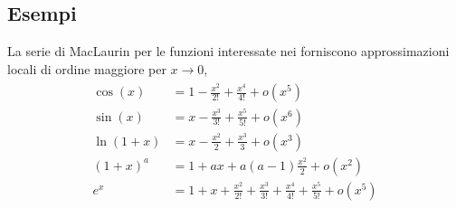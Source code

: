 \documentclass[letterpaper,10pt,italian]{jupyterBook}
\begin{document}
\subsection{Esempi}
\label{\detokenize{ch/infinitesimal_calculus/derivatives:esempi}}
\sphinxAtStartPar
La serie di MacLaurin per le funzioni interessate nei {\hyperref[\detokenize{ch/infinitesimal_calculus/analysis:infinitesimal-calculus-limits-fund}]{}} forniscono approssimazioni locali di ordine maggiore per \(x \rightarrow 0\),
\begin{equation}\label{equation:ch/infinitesimal_calculus/derivatives:eq:infinitesimal-calculus:derivatives:taylor:fund-limits}
\begin{split}\begin{aligned}
 \cos(x) & = 1 - \frac{x^2}{2!} + \frac{x^4}{4!} + o(x^5) \\
 \sin(x) & = x - \frac{x^3}{3!} + \frac{x^5}{5!} + o(x^6) \\
 \ln (1+x) & = x - \frac{x^2}{2} + \frac{x^3}{3} + o(x^3) \\
 (1+x)^a & = 1 + a x + a(a-1) \frac{x^2}{2} + o(x^2) \\
 e^x     & = 1 + x + \frac{x^2}{2!} + \frac{x^3}{3!} + \frac{x^4}{4!} + \frac{x^5}{5!} + o(x^5)
\end{aligned}\end{split}
\end{equation}
\sphinxAtStartPar
{} 
\end{document}
